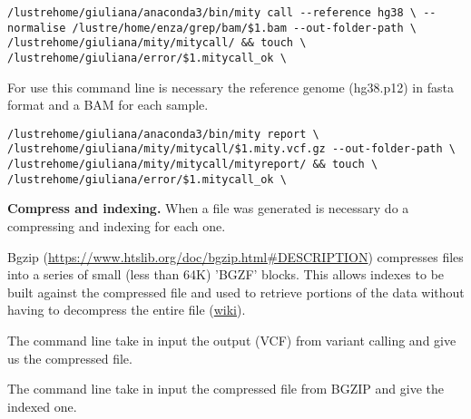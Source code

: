 \begin{verbatim}
/lustrehome/giuliana/anaconda3/bin/mity call --reference hg38 \ --normalise /lustre/home/enza/grep/bam/$1.bam --out-folder-path \ /lustrehome/giuliana/mity/mitycall/ && touch \ /lustrehome/giuliana/error/$1.mitycall_ok \
\end{verbatim}
For use this command line is necessary the reference genome (hg38.p12) in fasta format and a BAM for each sample. \newline
\begin{verbatim}
/lustrehome/giuliana/anaconda3/bin/mity report \ /lustrehome/giuliana/mity/mitycall/$1.mity.vcf.gz --out-folder-path \ /lustrehome/giuliana/mity/mitycall/mityreport/ && touch \ /lustrehome/giuliana/error/$1.mitycall_ok \
\end{verbatim}


\textbf{Compress and indexing.} When a file was generated is necessary do a compressing and indexing for each one. \newline

Bgzip (\url{https://www.htslib.org/doc/bgzip.html#DESCRIPTION}) compresses files into a series of small (less than 64K) 'BGZF' blocks. This allows indexes to be built against the compressed file and used to retrieve portions of the data without having to decompress the entire file (\href{https://www.htslib.org/doc/bgzip.html#DESCRIPTION}{wiki}). \newline 


The command line take in input the output (VCF) from variant calling and give us the compressed file. \newline 



The command line take in input the compressed file from BGZIP and give the indexed one.\newline

